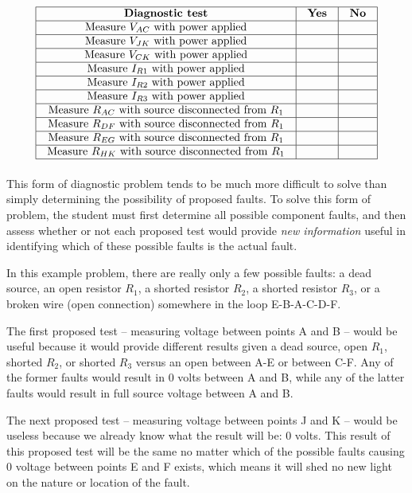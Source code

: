 $$\vbox{\offinterlineskip
\halign{\strut
\vrule \quad\hfil # \ \hfil & 
\vrule \quad\hfil # \ \hfil & 
\vrule \quad\hfil # \ \hfil \vrule \cr
\noalign{\hrule}
%
\textbf{Diagnostic test} & \textbf{Yes} & \textbf{No} \cr
%
\noalign{\hrule}
%
Measure $V_{AC}$ with power applied &  &  \cr
%
\noalign{\hrule}
%
Measure $V_{JK}$ with power applied &  &  \cr
%
\noalign{\hrule}
%
Measure $V_{CK}$ with power applied &  &  \cr
%
\noalign{\hrule}
%
Measure $I_{R1}$ with power applied &  &  \cr
%
\noalign{\hrule}
%
Measure $I_{R2}$ with power applied &  &  \cr
%
\noalign{\hrule}
%
Measure $I_{R3}$ with power applied &  &  \cr
%
\noalign{\hrule}
%
Measure $R_{AC}$ with source disconnected from $R_1$ &  &  \cr
%
\noalign{\hrule}
%
Measure $R_{DF}$ with source disconnected from $R_1$ &  &  \cr
%
\noalign{\hrule}
%
Measure $R_{EG}$ with source disconnected from $R_1$ &  &  \cr
%
\noalign{\hrule}
%
Measure $R_{HK}$ with source disconnected from $R_1$ &  &  \cr
%
\noalign{\hrule}
} %
}$$ %

\vskip 10pt

This form of diagnostic problem tends to be much more difficult to solve than simply determining the possibility of proposed faults.  To solve this form of problem, the student must first determine all possible component faults, and then assess whether or not each proposed test would provide \textit{new information} useful in identifying which of these possible faults is the actual fault.

In this example problem, there are really only a few possible faults: a dead source, an open resistor $R_1$, a shorted resistor $R_2$, a shorted resistor $R_3$, or a broken wire (open connection) somewhere in the loop E-B-A-C-D-F.

The first proposed test -- measuring voltage between points A and B -- would be useful because it would provide different results given a dead source, open $R_1$, shorted $R_2$, or shorted $R_3$ versus an open between A-E or between C-F.  Any of the former faults would result in 0 volts between A and B, while any of the latter faults would result in full source voltage between A and B.

The next proposed test -- measuring voltage between points J and K -- would be useless because we already know what the result will be: 0 volts.  This result of this proposed test will be the same no matter which of the possible faults causing 0 voltage between points E and F exists, which means it will shed no new light on the nature or location of the fault.

